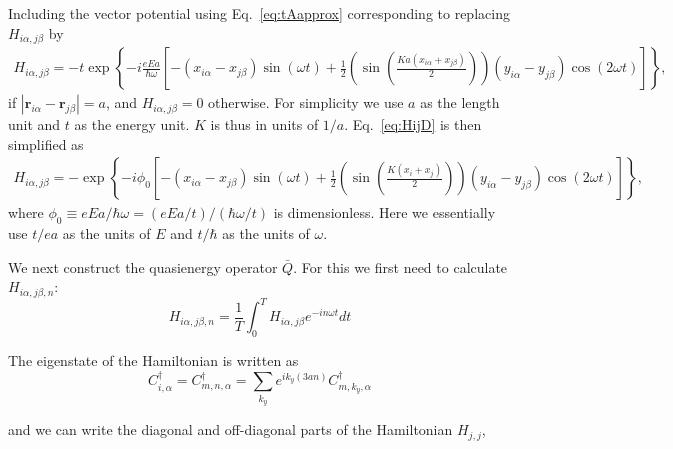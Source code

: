 \documentclass[aps,pra,preprint,showpacs]{revtex4-1}
\begin{document}
Including the vector potential using Eq.~\ref{eq:tAapprox} corresponding to replacing $H_{i\alpha,j\beta}$ by 
\begin{eqnarray}\label{eq:HijD}
	H_{i\alpha,j\beta} = - t \exp\left\{ -i\frac{eEa}{\hbar\omega}\left[-(x_{i\alpha} - x_{j\beta})\sin(\omega t) + \frac{1}{2} \left(\sin(\frac{Ka(x_{i\alpha}+x_{j\beta})}{2})\right) (y_{i\alpha} - y_{j\beta}) \cos(2\omega t) \right] \right\},
\end{eqnarray}
if $|\bm r_{i\alpha} -\bm r_{j\beta}| = a$, and $H_{i\alpha,j\beta} = 0$ otherwise. For simplicity we use $a$ as the length unit and $t$ as the energy unit. $K$ is thus in units of $1/a$. Eq.~\ref{eq:HijD} is then simplified as 
\begin{eqnarray}\label{eq:HijDdimenless}
	H_{i\alpha,j\beta} = - \exp \left\{ -i \phi_0 \left[-(x_{i\alpha} - x_{j\beta})\sin(\omega t) +\frac{1}{2} \left(\sin(\frac{K(x_i+x_j)}{2})\right ) (y_{i\alpha} - y_{j\beta}) \cos(2\omega t) \right] \right\},
\end{eqnarray}
where $\phi_0 \equiv eEa/\hbar \omega = (eEa/t)/(\hbar \omega/t)$ is dimensionless. Here we essentially use $t/ea$ as the units of $E$ and $t/\hbar$ as the units of $\omega$. 

We next construct the quasienergy operator $\bar{Q}$. For this we first need to calculate $H_{i\alpha,j\beta,n}$:
\begin{equation} \label{eq:HijDn}
	H_{i\alpha,j\beta,n} = \frac{1}{T} \int_0^T H_{i\alpha,j\beta} e^{-in\omega t} dt
\end{equation}

The eigenstate of the Hamiltonian is written as
\begin{equation}
	C_{i,\alpha }^{\dagger }=C_{m,n,\alpha }^{\dagger
	}=\sum\limits_{k_{y}}e^{ik_{y}(3an)}C_{m,k_{y},\alpha }^{\dagger }
\end{equation}

and we can write the diagonal and off-diagonal parts of the Hamiltonian $H_{j,j}$,
\end{document}
